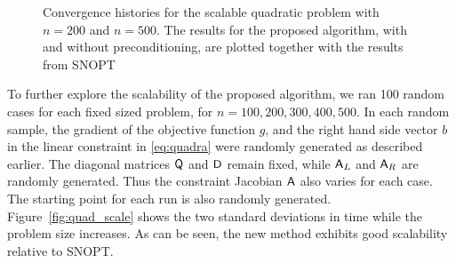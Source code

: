 \begin{figure}[tbp]
  \centering
   \hspace{1em}
   \caption{Convergence histories for the scalable quadratic problem with $n=200$ and
  $n=500$. The results for the proposed algorithm, with and without
  preconditioning, are plotted together with the results from
  SNOPT \label{fig:quad_hist}}
\end{figure}

To further explore the scalability of the proposed algorithm, we ran 100 random cases for 
each fixed sized problem, for $n = 100, 200, 300, 400, 500$.  In each random sample, the gradient 
of the objective function $g$, and the right hand side vector $b$ in the linear constraint in \eqref{eq:quadra} 
were randomly generated as described earlier. The diagonal matrices $\mathsf{Q}$ and $\mathsf{D}$ remain fixed, while $\mathsf{A}_L$ and $\mathsf{A}_R$ are randomly generated. Thus the constraint Jacobian $\mathsf{A}$ 
also varies for each case. 
The starting point for each run is also randomly generated. Figure~\ref{fig:quad_scale} shows the two standard deviations in time while
the problem size increases. As can be seen, the new method exhibits good scalability relative to SNOPT. 

